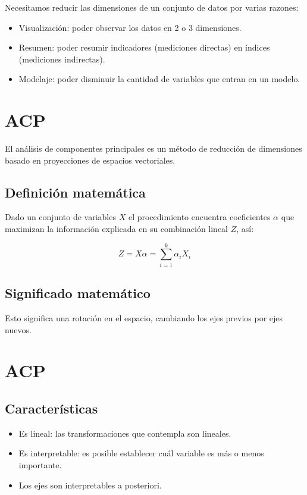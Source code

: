 \documentclass[
  letterpaper,
  DIV=11,
  numbers=noendperiod]{scrreprt}
\providecommand{\tightlist}{%
  \setlength{\itemsep}{0pt}\setlength{\parskip}{0pt}}\usepackage{longtable,booktabs,array}
\begin{document}
Necesitamos reducir las dimensiones de un conjunto de datos por varias
razones:

\begin{itemize}
\item
  Visualización: poder observar los datos en 2 o 3 dimensiones.
\item
  Resumen: poder resumir indicadores (mediciones directas) en índices
  (mediciones indirectas).
\item
  Modelaje: poder disminuir la cantidad de variables que entran en un
  modelo.
\end{itemize}

\section{ACP}\label{acp}

El análisis de componentes principales es un método de reducción de
dimensiones basado en proyecciones de espacios vectoriales.

\subsection{Definición matemática}\label{definiciuxf3n-matemuxe1tica}

Dado un conjunto de variables \(X\) el procedimiento encuentra
coeficientes \(\alpha\) que maximizan la información explicada en su
combinación lineal \(Z\), así:

\[Z = X\alpha = \sum_{i=1}^k \alpha_i X_i\]

\subsection{Significado matemático}\label{significado-matemuxe1tico}

Esto significa una rotación en el espacio, cambiando los ejes previos
por ejes nuevos.

\section{ACP}\label{acp-1}

\subsection{Características}\label{caracteruxedsticas}

\begin{itemize}
\tightlist
\item
  Es lineal: las transformaciones que contempla son lineales.
\item
  Es interpretable: es posible establecer cuál variable es más o menos
  importante.
\item
  Los ejes son interpretables a posteriori.
\end{itemize}
\end{document}

